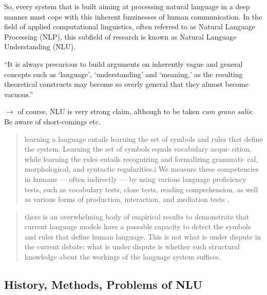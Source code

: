 
So, every system that is built aiming at processing natural language in a {\color{red} deep} manner
must cope with this inherent fuzzinesses of human communication. In the field of applied
computational linguistics, often referred to as Natural Language Processing (NLP), this subfield
of research is known as Natural Language Understanding (NLU).

``It is always precarious to build arguments on inherently vague and general
concepts such as `language', `understanding' and `meaning,' as the resulting
theoretical constructs may become so overly general that they almost become
vacuous.'' \cite{sahlgren2021singleton}

{\color{red} $\rightarrow$ of course, NLU is very strong claim, although to be taken \emph{cum grano salis}:
Be aware of short-comings etc.}

\begin{quote}
  learning a language entails learning the set of symbols and rules that define the
  system. Learning the set of symbols equals vocabulary acqui- sition, while learning
  the rules entails recognizing and formalizing grammati- cal, morphological, and
  syntactic regularities.i We measure these competencies in humans — often indirectly
  — by using various language proficiency tests, such as vocabulary tests, cloze
  tests, reading comprehension, as well as various forms of production, interaction,
  and mediation tests \textelp{}. \cite{sahlgren2021singleton}
\end{quote}

\begin{quote}
  there is an overwhelming body of empirical results to demonstrate that current language models
  have a passable capacity to detect the symbols and rules that define human language. This is not
  what is under dispute in the current debate; what is under dispute is whether such structural
  knowledge about the workings of the language system suffices.
\end{quote}

\subsection{History, Methods, Problems of NLU}


